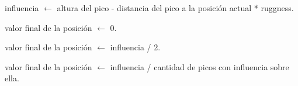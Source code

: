 \begin{algorithm}
\begin{algorithmic}

		\State influencia $\gets$ altura del pico - distancia del pico a la posición actual * ruggness.
	\EndFor
	
		\State valor final de la posición $\gets$ 0.
	
		\State valor final de la posición $\gets$ influencia / 2.
	
		\State valor final de la posición $\gets$ influencia / cantidad de picos con influencia sobre ella.
		
	\EndIf

\EndFor

\end{algorithmic}
\end{algorithm}